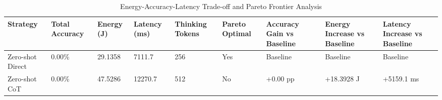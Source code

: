 \begin{table}
\caption{Energy-Accuracy-Latency Trade-off and Pareto Frontier Analysis}
\label{tab:tradeoff_comparison}
\begin{tabular}{lllllllll}
\toprule
Strategy & Total Accuracy & Energy (J) & Latency (ms) & Thinking Tokens & Pareto Optimal & Accuracy Gain vs Baseline & Energy Increase vs Baseline & Latency Increase vs Baseline \\
\midrule
Zero-shot Direct & 0.00\% & 29.1358 & 7111.7 & 256 & Yes & Baseline & Baseline & Baseline \\
Zero-shot CoT & 0.00\% & 47.5286 & 12270.7 & 512 & No & +0.00 pp & +18.3928 J & +5159.1 ms \\
\bottomrule
\end{tabular}
\end{table}
